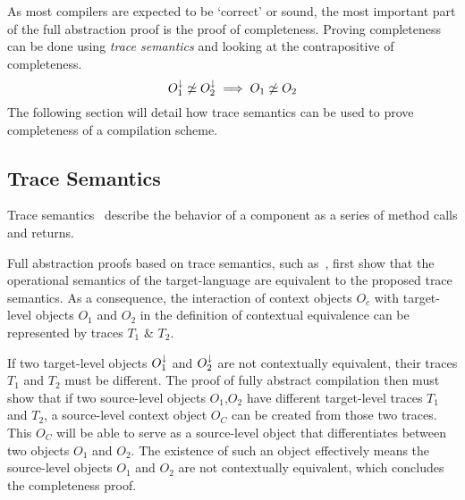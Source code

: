 As most compilers are expected to be `correct' or sound, the most important part of the full abstraction proof is the proof of completeness.
Proving completeness can be done using \emph{trace semantics} and looking at the contrapositive of completeness.
\[
    O_{1}^{\downarrow} \not\simeq O_{2}^{\downarrow} \implies O_{1} \not\simeq O_{2}
\]
The following section will detail how trace semantics can be used to prove completeness of a compilation scheme.

\subsection{Trace Semantics}
\label{sec:tracesemantics}
Trace semantics~\cite{Rathke, Patrignani:TraceSemantics} describe the behavior of a component as a series of method calls and returns.

Full abstraction proofs based on trace semantics, such as~\cite{Patrignani,Agten:2012:SCM:2354412.2355247}, first show that the operational semantics of the target-language are equivalent to the proposed trace semantics.
As a consequence, the interaction of context objects $O_{c}$ with target-level objects $O_{1}$ and $O_{2}$ in the definition of contextual equivalence can be represented by traces $T_{1}$ \& $T_{2}$.

If two target-level objects $O_1^{\downarrow}$ and $O_2^{\downarrow}$ are not contextually equivalent, their traces $T_1$ and $T_2$ must be different.
The proof of fully abstract compilation then must show that if two source-level objects $O_1$,$O_2$ have different target-level traces $T_1$ and $T_2$, a source-level context object $O_C$ can be created from those two traces.
This $O_C$ will be able to serve as a source-level object that differentiates between two objects $O_1$ and $O_2$.
The existence of such an object effectively means the source-level objects $O_1$ and $O_2$ are not contextually equivalent, which concludes the completeness proof.

